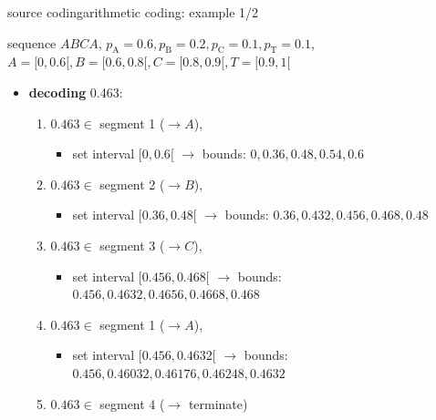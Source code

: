 	\begin{frame}{source coding}{arithmetic coding: example 1/2}
            \vspace{-3mm}
                \begin{footnotesize}
            sequence $ABCA$, $p_\mathrm{A} = 0.6, p_\mathrm{B}= 0.2, p_\mathrm{C}=0.1, p_\mathrm{T}=0.1$, \pause\mbox{\footnotesize $A = [0,0.6[, B= [0.6,0.8[, C=[0.8,0.9[, T=[0.9,1[$}
				\begin{itemize}
					\item	\textbf{decoding} 0.463: 
                        \begin{enumerate}
							\item	$0.463 \in$ segment 1 ($\rightarrow A$), 
                                \begin{itemize}
                                    \item set interval $[0,0.6[$ $ \rightarrow$ {bounds: $0,0.36,0.48,0.54,0.6$}
                                \end{itemize}
							\pause
                            \item	$0.463 \in$ segment 2 ($\rightarrow B$),
                                \begin{itemize}
                                    \item set interval $[0.36,0.48[$ $ \rightarrow$ {bounds: } {\footnotesize $0.36,0.432,0.456,0.468,0.48$}
                                \end{itemize}
							\pause
                            \item	$0.463 \in$ segment 3 ($\rightarrow C$), 
                                \begin{itemize}
                                    \item set interval $[0.456,0.468[$ $ \rightarrow$ {bounds: } {\footnotesize $0.456,0.4632,0.4656,0.4668,0.468$}
                                \end{itemize}
							\pause
                            \item	$0.463 \in$ segment 1 ($\rightarrow A$), 
                                \begin{itemize}
                                    \item set interval $[0.456, 0.4632[$ $ \rightarrow$ {bounds: } {\footnotesize $0.456,0.46032,0.46176,0.46248,0.4632$}
                                \end{itemize}
							\pause
                            \item   $0.463 \in$ segment 4 ($\rightarrow$ terminate)
						\end{enumerate}
		\end{itemize}
                \end{footnotesize}
	\end{frame}
	
